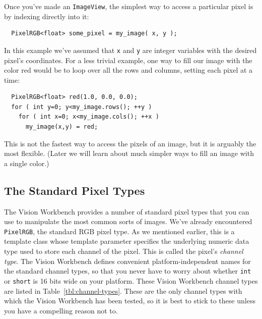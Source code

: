 Once you've made an \verb#ImageView#, the simplest way to access a 
particular pixel is by indexing directly into it:
\begin{verbatim}
  PixelRGB<float> some_pixel = my_image( x, y );
\end{verbatim}
In this example we've assumed that \verb#x# and \verb#y# are integer
variables with the desired pixel's coordinates.  For a less trivial
example, one way to fill our image with the color red would be to loop
over all the rows and columns, setting each pixel at a time:
\begin{verbatim}
  PixelRGB<float> red(1.0, 0.0, 0.0);
  for ( int y=0; y<my_image.rows(); ++y )
    for ( int x=0; x<my_image.cols(); ++x )
      my_image(x,y) = red;
\end{verbatim}
This is not the fastest way to access the pixels of an image, but 
it is arguably the most flexible.  (Later we will learn about much 
simpler ways to fill an image with a single color.)

\subsection{The Standard Pixel Types}

The Vision Workbench provides a number of standard pixel types that
you can use to manipulate the most common sorts of images.  We've
already encountered \verb#PixelRGB#, the standard RGB pixel type.  As
we mentioned earlier, this is a template class whose template
parameter specifies the underlying numeric data type used to store
each channel of the pixel.  This is called the pixel's {\it channel
  type}.  The Vision Workbench defines convenient platform-independent
names for the standard channel types, so that you never have to worry
about whether \verb#int# or \verb#short# is 16 bits wide on your
platform.  These Vision Workbench channel types are listed in
Table~\ref{tbl:channel-types}.  These are the only channel types with
which the Vision Workbench has been tested, so it is best to stick to
these unless you have a compelling reason not to.

